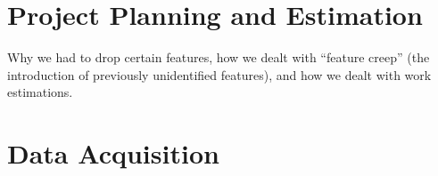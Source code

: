 \documentclass{l3proj}
\begin{document}

\section{Project Planning and Estimation}
\label{sec:planning}


Why we had to drop certain features, how we dealt with ``feature creep'' (the introduction of previously unidentified features), and how we dealt with work estimations.



\section{Data Acquisition}
\label{sec:data-acquisition}

\end{document}
